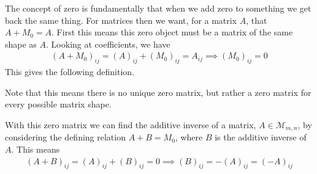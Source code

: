 The concept of zero is fundamentally that when we add zero to something we get back the same thing. For matrices then we want, for a matrix $A$, that $A + M_0 = A$. First this means this zero object must be a matrix of the same shape as $A$. Looking at coefficients, we have
\begin{align*}
(A + M_0)_{ij} = (A)_{ij} + (M_0)_{ij} = A_{ij} \implies (M_0)_{ij} = 0
\end{align*}
This gives the following definition.

Note that this means there is no unique zero matrix, but rather a zero matrix for every possible matrix shape.


With this zero matrix we can find the additive inverse of a matrix, $A\in\mathcal{M}_{m,n}$, by considering the defining relation $A+B=M_0$, where $B$ is the additive inverse of $A$. This means
\begin{align*}
(A+B)_{ij} = (A)_{ij}+(B)_{ij} = 0 \implies (B)_{ij} = - (A)_{ij} = (-A)_{ij}
\end{align*}







